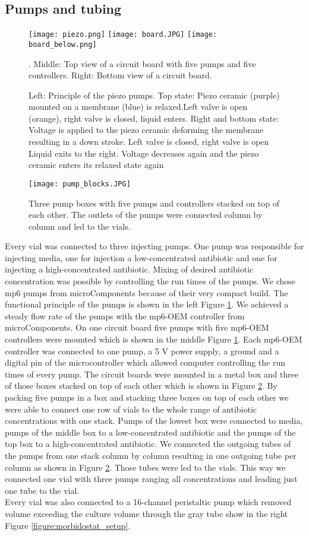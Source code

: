 \subsection{Pumps and tubing} 
\begin{figure}
	\texttt{[image: piezo.png]}
	\texttt{[image: board.JPG]}
	\texttt{[image: board\_below.png]}
	\caption{Left: Principle of the piezo pumps. Top state: Piezo ceramic (purple) mounted on a membrane (blue) is relaxed.Left valve is open (orange), right valve  is closed, liquid enters. Right and bottom state: Voltage is applied to the piezo ceramic deforming the membrane resulting in a down stroke. Left valve is closed, right valve is open Liquid exits to the right. Voltage decreases again and the piezo ceramic enters its relaxed state again \cite{piezo_pumps}}. Middle: Top view of a circuit board with five pumps and five controllers. Right: Bottom view of a circuit board. 
	\label{figure:pumps}
\end{figure}
\begin{figure}
	\texttt{[image: pump\_blocks.JPG]}
	\caption{Three pump boxes with five pumps and controllers stacked on top of each other. The outlets of the pumps were connected column by column and led to the vials.}
	\label{figure:tubing_setup}
\end{figure}
Every vial was connected to three injecting pumps. One pump was responsible for injecting media, one for injection a low-concentrated antibiotic and one for injecting a high-concentrated antibiotic. Mixing of desired antibiotic concentration was possible by controlling the run times of the pumps.
We chose mp6 pumps from microComponents because of their very compact build. The functional principle of the pumps is shown in the left Figure \ref{figure:pumps}. We achieved a steady flow rate of the pumps with the mp6-OEM controller from microComponents. On one circuit board five pumps with five mp6-OEM controllers were mounted which is shown in the middle Figure \ref{figure:pumps}. Each mp6-OEM controller was connected to one pump, a 5 V power supply, a ground and a digital pin of  the microcontroller which allowed computer controlling the run times of every pump. The circuit boards were mounted in a metal box and three of those boxes stacked on top of each other which is shown in Figure \ref{figure:tubing_setup}. By packing five pumps in a box and stacking three boxes on top of each other we were able to connect one row of vials to the whole range of antibiotic concentrations with one stack. Pumps of the lowest box were connected to media, pumps of the middle box to a low-concentrated antibiotic and the pumps of the top box to a high-concentrated antibiotic. We connected the outgoing tubes of the pumps from one stack column by column resulting in one outgoing tube per column as shown in Figure \ref{figure:tubing_setup}. Those tubes were led to the vials. This way we connected one vial with three pumps ranging all concentrations and leading just one tube to the vial.\\
Every vial was also connected to a 16-channel peristaltic pump which removed volume exceeding the culture volume through the gray tube show in the right Figure \ref{figure:morbidostat_setup}. 


